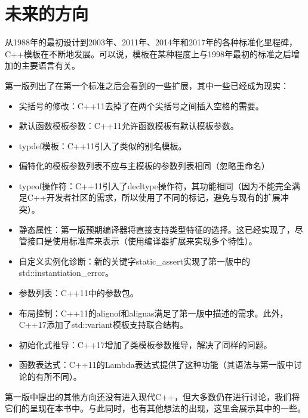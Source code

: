 \chapter{未来的方向}

从1988年的最初设计到2003年、2011年、2014年和2017年的各种标准化里程碑，C++模板在不断地发展。可以说，模板在某种程度上与1998年最初的标准之后增加的主要语言有关。

第一版列出了在第一个标准之后会看到的一些扩展，其中一些已经成为现实：

\begin{itemize}
\item 
尖括号的修改：C++11去掉了在两个尖括号之间插入空格的需要。

\item 
默认函数模板参数：C++11允许函数模板有默认模板参数。

\item 
typdef模板：C++11引入了类似的别名模板。

\item 
偏特化的模板参数列表不应与主模板的参数列表相同（忽略重命名）

\item 
typeof操作符：C++11引入了decltype操作符，其功能相同（因为不能完全满足C++开发者社区的需求，所以使用了不同的标记，避免与现有的扩展冲突）。

\item 
静态属性：第一版预期编译器将直接支持类型特征的选择。这已经实现了，尽管接口是使用标准库来表示（使用编译器扩展来实现多个特性）。

\item 
自定义实例化诊断：新的关键字static\_assert实现了第一版中的std::instantiation\_error。

\item 
参数列表：C++11中的参数包。

\item 
布局控制：C++11的alignof和alignas满足了第一版中描述的需求。此外，C++17添加了std::variant模板支持联合结构。

\item 
初始化式推导：C++17增加了类模板参数推导，解决了同样的问题。

\item 
函数表达式：C++11的Lambda表达式提供了这种功能（其语法与第一版中讨论的有所不同）。
\end{itemize}

第一版中提出的其他方向还没有进入现代C++，但大多数仍在进行讨论，我们将它们的呈现在本书中。与此同时，也有其他想法的出现，这里会展示其中的一些。















